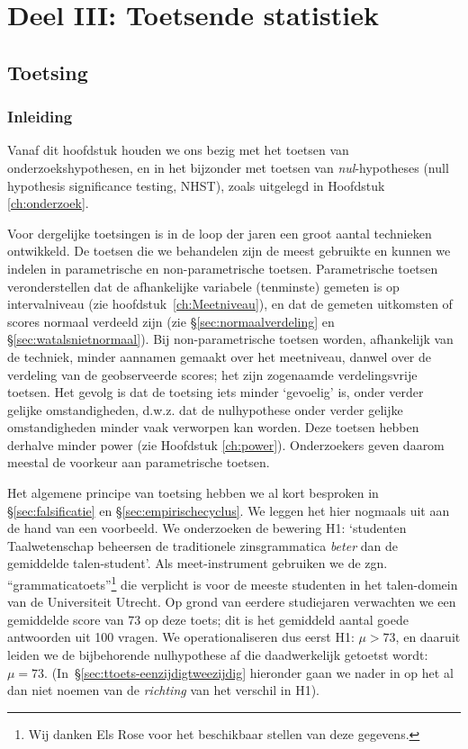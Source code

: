\documentclass[
]{book}
\begin{document}
\hypertarget{part-deel-iii-toetsende-statistiek}{%
\part*{Deel III: Toetsende statistiek}\label{part-deel-iii-toetsende-statistiek}}

\hypertarget{ch:toetsing}{%
\chapter{Toetsing}\label{ch:toetsing}}

\hypertarget{sec:toetsing-inleiding}{%
\section{Inleiding}\label{sec:toetsing-inleiding}}

Vanaf dit hoofdstuk houden we ons bezig met het toetsen van
onderzoekshypothesen, en in het bijzonder met toetsen van \emph{nul}-hypotheses (null hypothesis significance testing, NHST), zoals uitgelegd in Hoofdstuk \ref{ch:onderzoek}.

Voor dergelijke toetsingen is in de loop der jaren
een groot aantal technieken ontwikkeld. De toetsen die we behandelen
zijn de meest gebruikte en kunnen we indelen in parametrische en
non-parametrische toetsen. Parametrische toetsen veronderstellen dat de
afhankelijke variabele (tenminste) gemeten is op intervalniveau (zie
hoofdstuk~\ref{ch:Meetniveau}), en dat de gemeten uitkomsten of scores
normaal verdeeld zijn (zie
§\ref{sec:normaalverdeling} en
§\ref{sec:watalsnietnormaal}). Bij non-parametrische toetsen
worden, afhankelijk van de techniek, minder aannamen gemaakt over het
meetniveau, danwel over de verdeling van de geobserveerde scores; het
zijn zogenaamde verdelingsvrije toetsen. Het gevolg is dat de toetsing
iets minder `gevoelig' is, onder verder gelijke omstandigheden, d.w.z.
dat de nulhypothese onder verder gelijke omstandigheden minder vaak
verworpen kan worden. Deze toetsen hebben derhalve minder power (zie
Hoofdstuk \ref{ch:power}). Onderzoekers geven daarom meestal de voorkeur
aan parametrische toetsen.

Het algemene principe van toetsing hebben we al kort besproken in
§\ref{sec:falsificatie} en
§\ref{sec:empirischecyclus}.
We leggen het hier nogmaals uit aan
de hand van een voorbeeld. We onderzoeken de bewering H1: `studenten
Taalwetenschap beheersen de traditionele zinsgrammatica \emph{beter} dan de
gemiddelde talen-student'. Als meet-instrument gebruiken we de zgn.
``grammaticatoets''\footnote{Wij danken Els Rose voor het beschikbaar stellen van deze gegevens.} die verplicht is voor de meeste studenten in het
talen-domein van de Universiteit Utrecht. Op grond van eerdere
studiejaren verwachten we een gemiddelde score van 73 op deze toets; dit
is het gemiddeld aantal goede antwoorden uit 100 vragen. We
operationaliseren dus eerst H1: \(\mu > 73\), en daaruit leiden we de
bijbehorende nulhypothese af die daadwerkelijk getoetst wordt:
\(\mu = 73\).
(In~§\ref{sec:ttoets-eenzijdigtweezijdig} hieronder gaan we nader in
op het al dan niet noemen van de \emph{richting} van het verschil in H1).
\end{document}
